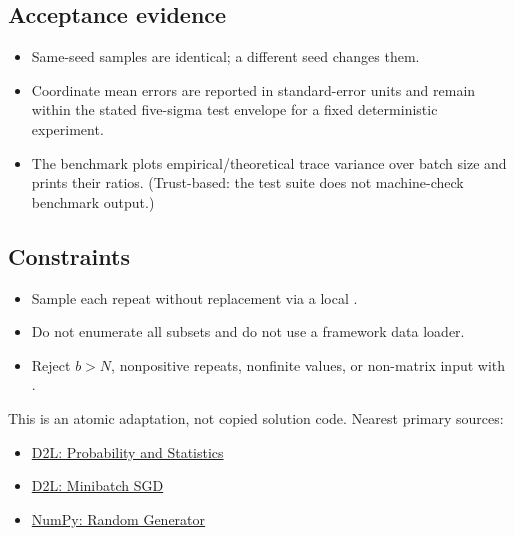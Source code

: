         \subsection{Acceptance evidence}

        \begin{evidencebox}
        \begin{itemize}
          \item Same-seed samples are identical; a different seed changes them.
  \item Coordinate mean errors are reported in standard-error units and remain within the stated five-sigma test envelope for a fixed deterministic experiment.
  \item The benchmark plots empirical/theoretical trace variance over batch size and prints their ratios. (Trust-based: the test suite does not machine-check benchmark output.)
        \end{itemize}
        \end{evidencebox}

        \subsection{Constraints}

        \begin{itemize}
          \item Sample each repeat without replacement via a local .
  \item Do not enumerate all subsets and do not use a framework data loader.
  \item Reject $b>N$, nonpositive repeats, nonfinite values, or non-matrix input with .
        \end{itemize}

        \begin{sourcebox}
        This is an atomic adaptation, not copied solution code. Nearest primary sources:
        \begin{itemize}
          \item \href{https://d2l.ai/chapter_preliminaries/probability.html}{D2L: Probability and Statistics}
  \item \href{https://d2l.ai/chapter_optimization/minibatch-sgd.html}{D2L: Minibatch SGD}
  \item \href{https://numpy.org/doc/stable/reference/random/generator.html}{NumPy: Random Generator}
        \end{itemize}
        \end{sourcebox}
